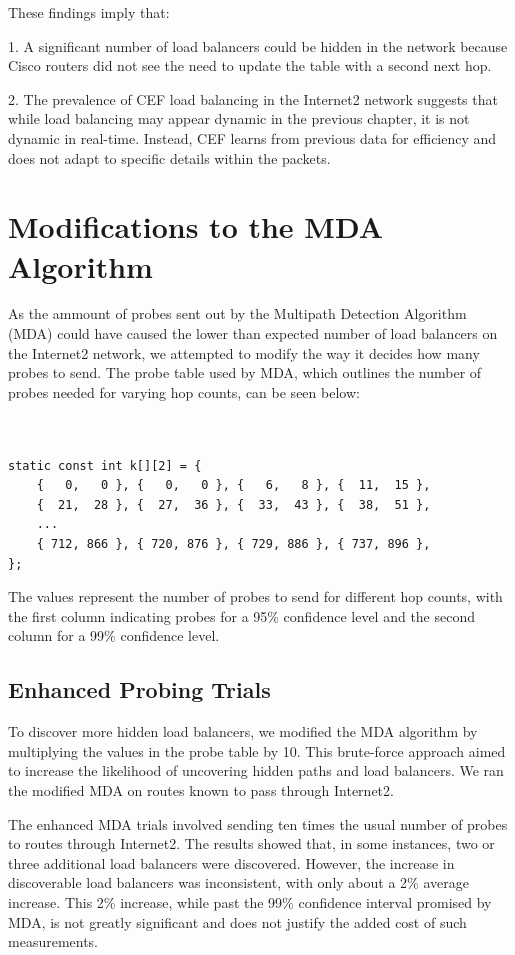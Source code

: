 \documentclass[12pt]{cwru_thesis}
\begin{document}
These findings imply that:

1. A significant number of load balancers could be hidden in the network because Cisco routers did not see the need to update the table with a second next hop.


2. The prevalence of CEF load balancing in the Internet2 network suggests that while load balancing may appear dynamic in the previous chapter, it is not dynamic in real-time. Instead, CEF learns from previous data for efficiency and does not adapt to specific details within the packets.


\section{Modifications to the MDA Algorithm}
\label{chap:MDA}

As the ammount of probes sent out by the Multipath Detection Algorithm (MDA) could have caused the lower than expected number of load balancers on the Internet2 network, we attempted to modify the way it decides how many probes to send.  The probe table used by MDA, which outlines the number of probes needed for varying hop counts, can be seen below:

\begin{verbatim}


static const int k[][2] = {
    {   0,   0 }, {   0,   0 }, {   6,   8 }, {  11,  15 },
    {  21,  28 }, {  27,  36 }, {  33,  43 }, {  38,  51 }, 
    ...
    { 712, 866 }, { 720, 876 }, { 729, 886 }, { 737, 896 }, 
};
\end{verbatim}

The values represent the number of probes to send for different hop counts, with the first column indicating probes for a 95\% confidence level and the second column for a 99\% confidence level.

\subsection{Enhanced Probing Trials}

To discover more hidden load balancers, we modified the MDA algorithm by multiplying the values in the probe table by 10. This brute-force approach aimed to increase the likelihood of uncovering hidden paths and load balancers. We ran the modified MDA on routes known to pass through Internet2.


The enhanced MDA trials involved sending ten times the usual number of probes to routes through Internet2. The results showed that, in some instances, two or three additional load balancers were discovered. However, the increase in discoverable load balancers was inconsistent, with only about a 2\% average increase. This 2\% increase, while past the 99\% confidence interval promised by MDA, is not greatly significant and does not justify the added cost of such measurements.
\end{document}
